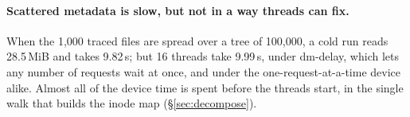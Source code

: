 \paragraph{Scattered metadata is slow, but not in a way threads can fix.} When the
1{,}000 traced files are spread over a tree of 100{,}000, a cold run reads 28.5\,MiB
and takes 9.82\,s; but 16 threads take 9.99\,s, under dm-delay, which lets any number of
requests wait at once, and under the one-request-at-a-time device alike. Almost all of
the device time is spent before the threads start, in the single walk that builds the
inode map (\S\ref{sec:decompose}).

\begin{table}[t]
\centering
\caption{Speedup of 16 threads over the sequential loop, and in parentheses the
sequential loop's time, for each delay model and configured delay. Medians of five
runs (95\% bootstrap intervals in \texttt{results/numbers.json}).}
\label{tab:models}
\small
{}
\end{table}

